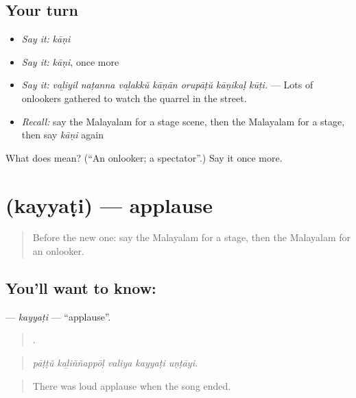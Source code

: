 \subsection*{Your turn}
\begin{itemize}
\raggedright
  \item \emph{Say it:} \emph{kāṇi}
  \item \emph{Say it:} \emph{kāṇi}, once more
  \item \emph{Say it:} \emph{vaḻiyil naṭanna vaḻakkŭ kāṇān orupāṭŭ kāṇikaḷ kūṭi.} — Lots of onlookers gathered to watch the quarrel in the street.
  \item \emph{Recall:} say the Malayalam for a stage scene, then the Malayalam for a stage, then say \emph{kāṇi} again
\end{itemize}

\begin{tcolorbox}[breakable,colback=teal!4,colframe=teal!35!black,title={Before you move on}]
What does  mean? (\textquotedblleft{}An onlooker; a spectator\textquotedblright{}.) Say it once more.
\end{tcolorbox}
\section[\texorpdfstring{\ml{കയ്യടി} (kayyaṭi)}{കയ്യടി (kayyaṭi)}]{ (kayyaṭi) — applause}

\label{lesson:ML-C563-kayyati}



\begin{quote}
Before the new one: say the Malayalam for a stage, then the Malayalam for an onlooker.
\end{quote}

\subsection*{You'll want to know: }
\textbf{} — \emph{kayyaṭi} — \textquotedblleft{}applause\textquotedblright{}.

\begin{quote}
    .
\end{quote}

\begin{quote}
\emph{pāṭṭŭ kaḻiññappōḷ valiya kayyaṭi uṇṭāyi.}
\end{quote}

\begin{quote}
There was loud applause when the song ended.
\end{quote}

